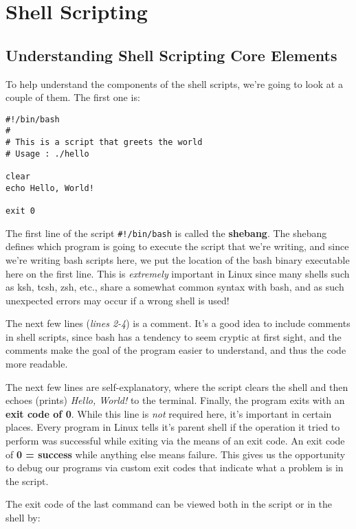 \chapter{Shell Scripting}

	\section{Understanding Shell Scripting Core Elements}
To help understand the components of the shell scripts, we're going to look at a couple of them. The first one is:

\vspace{-15pt}
\begin{verbatim}
#!/bin/bash
# 
# This is a script that greets the world
# Usage : ./hello

clear
echo Hello, World!

exit 0
\end{verbatim}
\vspace{-10pt}	

\noindent
The first line of the script \verb|#!/bin/bash| is called the \textbf{shebang}. The shebang defines which program is going to execute the script that we're writing, and since we're writing bash scripts here, we put the location of the bash binary executable here on the first line. This is \textit{extremely} important in Linux since many shells such as ksh, tcsh, zsh, etc., share a somewhat common syntax with bash, and as such unexpected errors may occur if a wrong shell is used!

The next few lines (\textit{lines 2-4}) is a comment. It's a good idea to include comments in shell scripts, since bash has a tendency to seem cryptic at first sight, and the comments make the goal of the program easier to understand, and thus the code more readable. 

The next few lines are self-explanatory, where the script clears the shell and then echoes (prints) \textit{Hello, World!} to the terminal. Finally, the program exits with an \textbf{exit code of 0}. While this line is \textit{not} required here, it's important in certain places. Every program in Linux tells it's parent shell if the operation it tried to perform was successful while exiting via the means of an exit code. An exit code of \textbf{0 = success} while anything else means failure. This gives us the opportunity to debug our programs via custom exit codes that indicate what a problem is in the script. 

The exit code of the last command can be viewed both in the script or in the shell by:

